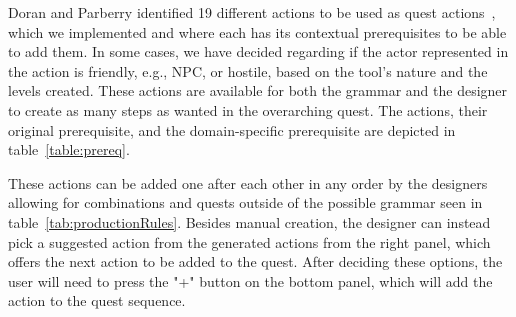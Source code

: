 



Doran and Parberry identified 19 different actions to be used as quest actions~\cite{p8Doran2011-questsMMORPGs}, which we implemented and where each has its contextual prerequisites to be able to add them. In some cases, we have decided regarding if the actor represented in the action is friendly, e.g., NPC, or hostile, based on the tool's nature and the levels created. These actions are available for both the grammar and the designer to create as many steps as wanted in the overarching quest. The actions, their original prerequisite, and the domain-specific prerequisite are depicted in table~\ref{table:prereq}. 

These actions can be added one after each other in any order by the designers allowing for combinations and quests outside of the possible grammar seen in table~\ref{tab:productionRules}. Besides manual creation, the designer can instead pick a suggested action from the generated actions from the right panel, which offers the next action to be added to the quest. After deciding these options, the user will need to press the "+" button on the bottom panel, which will add the action to the quest sequence.






